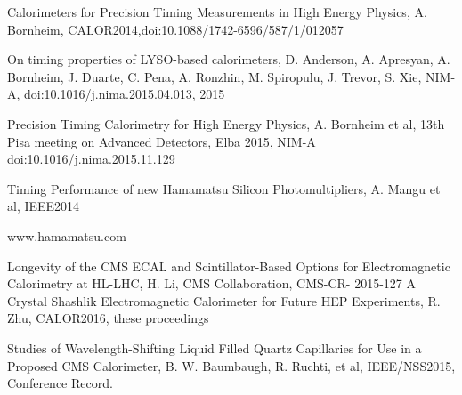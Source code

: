 \documentclass[preprint,1p]{elsarticle}
\begin{document}

{}
 

\begin{thebibliography}{00}
 Calorimeters for Precision Timing Measurements in High Energy Physics, A. Bornheim, CALOR2014,doi:10.1088/1742-6596/587/1/012057

 On timing properties of LYSO-based calorimeters, D. Anderson, A. Apresyan, A. Bornheim, J. Duarte, C. Pena, A. Ronzhin, M. Spiropulu, J. Trevor, S. Xie, NIM-A, doi:10.1016/j.nima.2015.04.013, 2015

 Precision Timing Calorimetry for High Energy Physics, A. Bornheim et al, 13th Pisa meeting on Advanced Detectors, Elba 2015, NIM-A doi:10.1016/j.nima.2015.11.129

Timing Performance of new Hamamatsu Silicon Photomultipliers, A. Mangu et al, IEEE2014

 www.hamamatsu.com



 Longevity of the CMS ECAL and Scintillator-Based Options for Electromagnetic Calorimetry at HL-LHC, H. Li, CMS Collaboration, CMS-CR-
2015-127 
 A Crystal Shashlik Electromagnetic Calorimeter for Future HEP Experiments, R. Zhu, CALOR2016, these proceedings

 Studies of Wavelength-Shifting Liquid Filled Quartz Capillaries for Use in a Proposed CMS Calorimeter, B. W. Baumbaugh, R. Ruchti, 
et al, IEEE/NSS2015, Conference Record.






\end{thebibliography}
\end{document}
